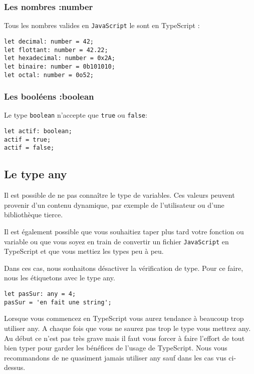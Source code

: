 \subsubsection{Les nombres :number}
Tous les nombres valides en {\tt JavaScript} le sont en {\color{monOrange}TypeScript} :
\begin{verbatim}
let decimal: number = 42;
let flottant: number = 42.22;
let hexadecimal: number = 0x2A;
let binaire: number = 0b101010;
let octal: number = 0o52;
\end{verbatim}

\subsubsection{Les booléens :boolean}
Le type {\tt boolean} n'accepte que {\tt true} ou {\tt false}:
\begin{verbatim}
let actif: boolean;
actif = true;
actif = false;
\end{verbatim}

\subsection{Le type any}
Il est possible de ne pas connaître le type de variables. Ces valeurs peuvent provenir d'un contenu dynamique, par exemple de l'utilisateur ou d'une bibliothèque tierce.

Il est également possible que vous souhaitiez taper plus tard votre fonction ou variable ou que vous soyez en train de convertir un fichier {\tt JavaScript} en {\color{monOrange}TypeScript} et que vous mettiez les types peu à peu.

Dans ces cas, nous souhaitons désactiver la vérification de type. Pour ce faire, nous les étiquetons avec le type {\color{blue}any}.
\begin{verbatim}
let pasSur: any = 4;
pasSur = 'en fait une string';
\end{verbatim}

Lorsque vous commencez en {\color{monOrange}TypeScript} vous aurez tendance à beaucoup trop utiliser {\color{blue} any}. A chaque fois que vous ne saurez pas trop le type vous mettrez {\color{blue} any}. Au début ce n'est pas très grave mais il faut vous forcer à faire l'effort de tout bien typer pour garder les bénéfices de l'usage de  {\color{monOrange}TypeScript}. Nous vous recommandons de ne quasiment jamais utiliser {\color{blue} any} sauf dans les cas vus ci-dessus.

